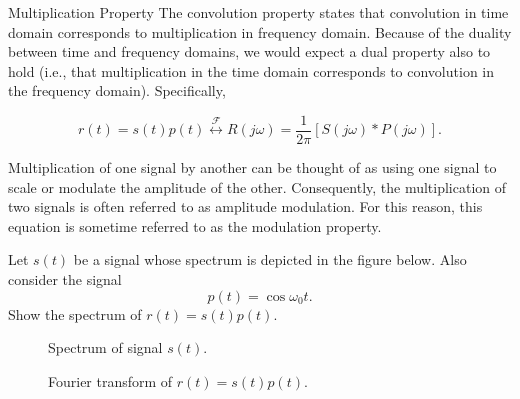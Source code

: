 \begin{frame}{Multiplication Property}
    The convolution property states that convolution in \alert{time} domain corresponds to multiplication in \alert{frequency} domain. Because of the duality between time and frequency domains, we would expect a dual property also to hold (i.e., that multiplication in the time domain corresponds to convolution in the frequency domain). Specifically,

    \begin{equation*}
        r(t) = s(t)p(t) \overset{\mathcal{F}}{\longleftrightarrow} R(j\omega) = \frac{1}{2\pi}[S(j\omega)\ast P(j\omega)].
    \end{equation*}

    Multiplication of one signal by another can be thought of as using one signal to scale or \alert{modulate} the amplitude of the other. Consequently, the multiplication of two signals is often referred to as \alert{amplitude modulation}. For this reason, this equation is sometime referred to as the \alert{modulation property}.
\end{frame}

\begin{frame}[plain]
    \begin{example}
        Let $s(t)$ be a signal whose spectrum is depicted in the figure below. Also consider the signal
        \begin{equation*}
            p(t) = \cos\omega_0 t.
        \end{equation*}
        Show the spectrum of $r(t) = s(t)p(t)$.

        \begin{figure}
          \centering
          
          \caption{Spectrum of signal $s(t)$.}\label{fi:signal_for_modulation}
        \end{figure}
    \end{example}
\end{frame}
\begin{frame}[plain]
    {
        \begin{figure}
          \centering
          
          \caption{Fourier transform of $r(t) = s(t)p(t)$.}\label{fi:modulation_property}
        \end{figure}
    }


\end{frame} 
